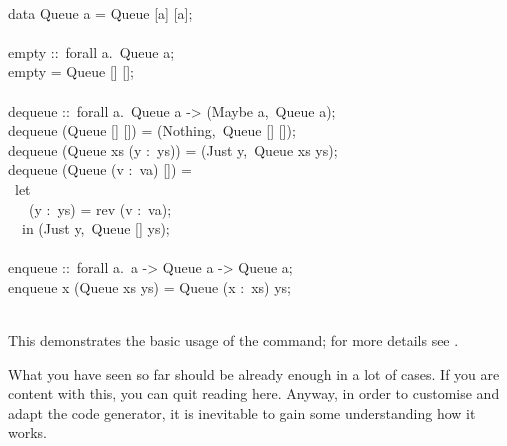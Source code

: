 \begin{isabellebody}
\begin{isamarkuptext}
\hspace*{0pt}\\
\hspace*{0pt}data Queue a = Queue [a] [a];\\
\hspace*{0pt}\\
\hspace*{0pt}empty ::~forall a.~Queue a;\\
\hspace*{0pt}empty = Queue [] [];\\
\hspace*{0pt}\\
\hspace*{0pt}dequeue ::~forall a.~Queue a -> (Maybe a,~Queue a);\\
\hspace*{0pt}dequeue (Queue [] []) = (Nothing,~Queue [] []);\\
\hspace*{0pt}dequeue (Queue xs (y :~ys)) = (Just y,~Queue xs ys);\\
\hspace*{0pt}dequeue (Queue (v :~va) []) =\\
\hspace*{0pt} ~let {}\\
\hspace*{0pt} ~~~(y :~ys) = rev (v :~va);\\
\hspace*{0pt} ~{}~in (Just y,~Queue [] ys);\\
\hspace*{0pt}\\
\hspace*{0pt}enqueue ::~forall a.~a -> Queue a -> Queue a;\\
\hspace*{0pt}enqueue x (Queue xs ys) = Queue (x :~xs) ys;\\
\hspace*{0pt}\\
\hspace*{0pt}{\char125}%
\end{isamarkuptext}%
\isamarkuptrue%
%
\endisatagquote
{\isafoldquote}%
%
\isadelimquote
%
\endisadelimquote
%
\begin{isamarkuptext}%
\noindent This demonstrates the basic usage of the \hyperlink{command.export-code}{\mbox{}} command;
  for more details see .%
\end{isamarkuptext}%
\isamarkuptrue%
%
\isamarkuptrue%
%
\begin{isamarkuptext}%
What you have seen so far should be already enough in a lot of cases.  If you
  are content with this, you can quit reading here.  Anyway, in order to customise
  and adapt the code generator, it is inevitable to gain some understanding
  how it works.


\end{isamarkuptext}
\end{isabellebody}

